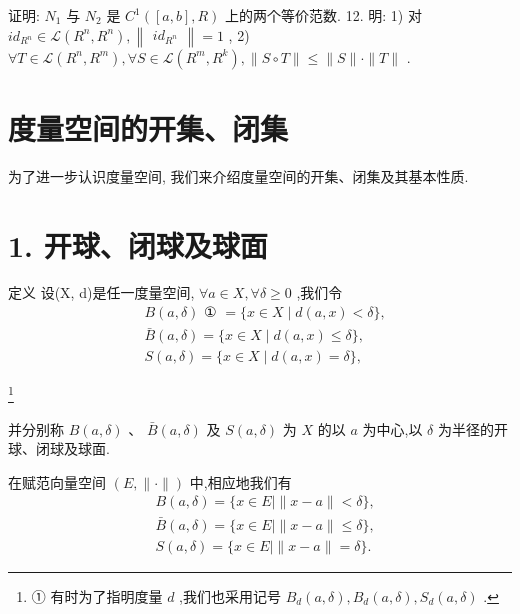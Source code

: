 证明: ${N}_{1}$ 与 ${N}_{2}$ 是 ${C}^{1}\left( {\left\lbrack  {a,b}\right\rbrack  ,R}\right)$ 上的两个等价范数. 12. 明: 1) 对 $i{d}_{{R}^{n}} \in  \mathcal{L}\left( {{R}^{n},{R}^{n}}\right) ,\begin{Vmatrix}{i{d}_{{R}^{n}}}\end{Vmatrix} = 1$ , 2) $\forall T \in  \mathcal{L}\left( {{R}^{n},{R}^{m}}\right) ,\forall S \in  \mathcal{L}\left( {{R}^{m},{R}^{k}}\right) ,\parallel S \circ  T\parallel  \leq  \parallel S\parallel  \cdot  \parallel T\parallel$ .

\section{度量空间的开集、闭集}

为了进一步认识度量空间, 我们来介绍度量空间的开集、闭集及其基本性质.

\section*{1. 开球、闭球及球面}

定义 设(X, d)是任一度量空间, $\forall a \in  X,\forall \delta  \geq  0$ ,我们令
\begin{align*}
	&B\left( {a,\delta }\right) \text{ ① } = \{ x \in  X \mid  d\left( {a,x}\right)  < \delta \} ,\\
	&\bar{B}\left( {a,\delta }\right)  = \{ x \in  X \mid  d\left( {a,x}\right)  \leq  \delta \} ,\\
	&S\left( {a,\delta }\right)  = \{ x \in  X \mid  d\left( {a,x}\right)  = \delta \} ,
\end{align*}

\footnote{
	
	① 有时为了指明度量 $d$ ,我们也采用记号 ${B}_{d}\left( {a,\delta }\right) ,{B}_{d}\left( {a,\delta }\right) ,{S}_{d}\left( {a,\delta }\right)$ .
	
}

并分别称 $B\left( {a,\delta }\right)$ 、 $\bar{B}\left( {a,\delta }\right)$ 及 $S\left( {a,\delta }\right)$ 为 $X$ 的以 $a$ 为中心,以 $\delta$ 为半径的开球、闭球及球面.

在赋范向量空间 $\left( {E,\parallel  \cdot  \parallel }\right)$ 中,相应地我们有
\begin{align*}
	&B\left( {a,\delta }\right)  = \{ x \in  E \mid  \parallel x - a\parallel  < \delta \} ,\\
	&\bar{B}\left( {a,\delta }\right)  = \{ x \in  E \mid  \parallel x - a\parallel  \leq  \delta \} ,\\
	&S\left( {a,\delta }\right)  = \{ x \in  E \mid  \parallel x - a\parallel  = \delta \} .
\end{align*}

